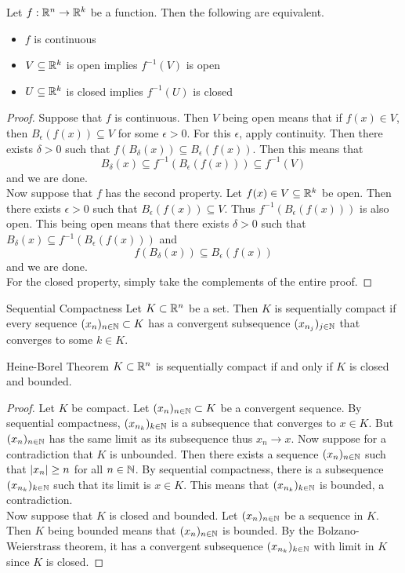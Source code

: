 \documentclass[a4paper]{article}
\begin{document}
\begin{thm}{}{} Let $f:\mathbb{R}^n\to\mathbb{R}^k$ be a function. Then the following are equivalent. 
\begin{itemize}
\item $f$ is continuous
\item $V\subseteq\mathbb{R}^k$ is open implies $f^{-1}(V)$ is open
\item $U\subseteq\mathbb{R}^k$ is closed implies $f^{-1}(U)$ is closed
\end{itemize}

\begin{proof}
Suppose that $f$ is continuous. Then $V$ being open means that if $f(x)\in V$, then $B_\epsilon(f(x))\subseteq V$ for some $\epsilon>0$. For this $\epsilon$, apply continuity. Then there exists $\delta>0$ such that $f(B_\delta(x))\subseteq B_\epsilon(f(x))$. Then this means that $$B_\delta(x)\subseteq f^{-1}(B_\epsilon(f(x)))\subseteq f^{-1}(V)$$ and we are done. \\
Now suppose that $f$ has the second property. Let $f(x)\in V\subseteq\mathbb{R}^k$ be open. Then there exists $\epsilon>0$ such that $B_\epsilon(f(x))\subseteq V$. Thus $f^{-1}(B_\epsilon(f(x)))$ is also open. This being open means that there exists $\delta>0$ such that $B_\delta(x)\subseteq f^{-1}(B_\epsilon(f(x)))$ and $$f(B_\delta(x))\subseteq B_\epsilon(f(x))$$ and we are done. \\
For the closed property, simply take the complements of the entire proof. 
\end{proof}
\end{thm}

\begin{defn}{Sequential Compactness}{} Let $K\subset\mathbb{R}^n$ be a set. Then $K$ is sequentially compact if every sequence $(x_n)_{n\in\mathbb{N}}\subset K$ has a convergent subsequence $(x_{n_j})_{j\in\mathbb{N}}$ that converges to some $k\in K$. 
\end{defn}

\begin{prp}{Heine-Borel Theorem}{} $K\subset\mathbb{R}^n$ is sequentially compact if and only if $K$ is closed and bounded. 
\begin{proof}
Let $K$ be compact. Let $(x_n)_{n\in\mathbb{N}}\subset K$ be a convergent sequence. By sequential compactness, $(x_{n_k})_{k\in\mathbb{N}}$ is a subsequence that converges to $x\in K$. But $(x_n)_{n\in\mathbb{N}}$ has the same limit as its subsequence thus $x_n\to x$. Now suppose for a contradiction that $K$ is unbounded. Then there exists a sequence $(x_n)_{n\in\mathbb{N}}$ such that $\abs{x_n}\geq n$ for all $n\in\mathbb{N}$. By sequential compactness, there is a subsequence $(x_{n_k})_{k\in\mathbb{N}}$ such that its limit is $x\in K$. This means that $(x_{n_k})_{k\in\mathbb{N}}$ is bounded, a contradiction. \\
Now suppose that $K$ is closed and bounded. Let $(x_n)_{n\in\mathbb{N}}$ be a sequence in $K$. Then $K$ being bounded means that $(x_n)_{n\in\mathbb{N}}$ is bounded. By the Bolzano-Weierstrass theorem, it has a convergent subsequence $(x_{n_k})_{k\in\mathbb{N}}$ with limit in $K$ since $K$ is closed. 
\end{proof}
\end{prp}
\end{document}
